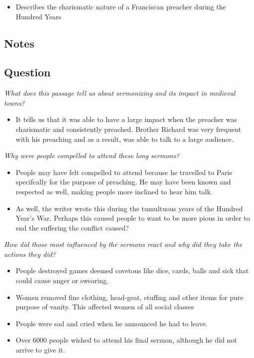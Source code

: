 \documentclass[12pt]{article}
\begin{document}
{\begin{itemize}
	\item Describes the charismatic nature of a Franciscan preacher during the Hundred Years
\end{itemize}

\subsection*{Notes}

\subsection*{Question}

\textit{What does this passage tell us about sermonizing and its impact in medieval towns?}
\begin{itemize}
	\item It tells us that it was able to have a large impact when the preacher was charismatic and consistently preached. Brother Richard was very frequent with his preaching and as a result, was able to talk to a large audience.
\end{itemize}
\textit{Why were people compelled to attend these long sermons?}
\begin{itemize}
	\item People may have felt compelled to attend because he travelled to Paris specifcally for the purpose of preaching. He may have been known and respected as well, making people more inclined to hear him talk.
	\item As well, the writer wrote this during the tumultuous years of the Hundred Year's War. Perhaps this caused people to want to be more pious in order to end the suffering the conflict caused?
\end{itemize}
\textit{How did those most influenced by the sermons react and why did they take the actions they did?}
\begin{itemize}
	\item People destroyed games deemed covetous like dice, cards, balls and sick that could cause anger or swearing.
	\item Women removed fine clothing, head-geat, stuffing and other items for pure purpose of vanity. This affected women of all social classes
	\item People were sad and cried when he announced he had to leave.
	\item Over 6000 people wished to attend his final sermon, although he did not arrive to give it.
\end{itemize}

}
\end{document}
